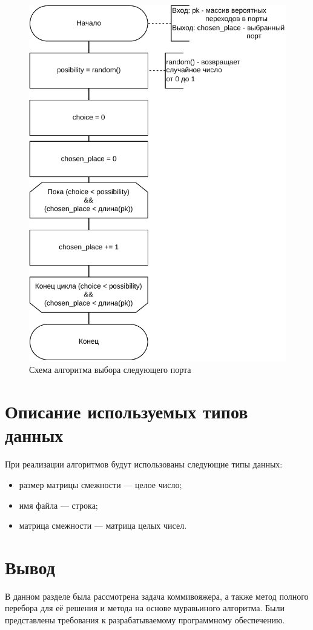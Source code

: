 \begin{figure}[h]
	\centering
	\includegraphics[height=0.7\textheight]{img/rand-choice.pdf}
	\caption{Схема алгоритма выбора следующего порта}
	\label{fig:rand-choice}
\end{figure}

\clearpage

\section{Описание используемых типов данных}
При реализации алгоритмов будут использованы следующие типы данных:
\begin{itemize}[label=---]
	\item размер матрицы смежности --- целое число;
	\item имя файла --- строка;
	\item матрица смежности --- матрица целых чисел.
\end{itemize}

\section*{Вывод}
В данном разделе была рассмотрена задача коммивояжера, а также метод полного перебора для её решения и метода на основе муравьиного алгоритма. Были представлены требования к разрабатываемому программному обеспечению.
